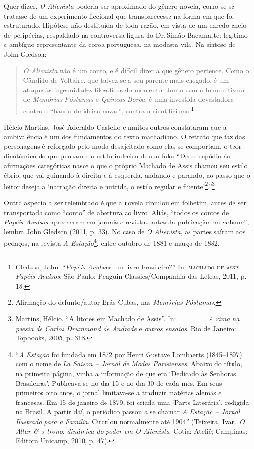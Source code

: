 Quer dizer, \emph{O Alienista} poderia ser aproximado do gênero novela,
como se se tratasse de um experimento ficcional que transparecesse na
forma em que foi estruturado. Hipótese não destituída de toda razão, em
vista de um enredo cheio de peripécias, respaldado na controversa figura
do Dr.\,Simão Bacamarte: legítimo e ambíguo representante da coroa
portuguesa, na modesta vila. Na síntese de John Gledson:

\begin{quote}
\emph{O Alienista} não é um conto, e é difícil dizer a que gênero
pertence. Como o Cândido de Voltaire, que talvez seja seu parente mais
chegado, é um ataque às ingenuidades filosóficas do momento. Junto com o
humanitismo de \emph{Memórias Póstumas} e \emph{Quincas Borba}, é uma
investida devastadora contra o ``bando de ideias novas'', contra o
cientificismo.\footnote{Gledson, John. ``\emph{Papéis Avulsos}: um livro
  brasileiro?'' In: \textsc{machado de assis}. \emph{Papéis Avulsos}. São Paulo:
  Penguin Classics/Companhia das Letras, 2011, p. 18.}
\end{quote}

Hélcio Martins, José Aderaldo Castello e muitos outros constataram que a
ambivalência é um dos fundamentos do texto machadiano. O retrato que faz
das personagens é reforçado pelo modo desajeitado como elas se
comportam, o teor dicotômico do que pensam e o estilo indeciso de sua
fala: ``Desse repúdio às afirmações categóricas nasce o que o próprio
Machado de Assis chamou seu estilo ébrio, que vai guinando à direita e à
esquerda, andando e parando, ao passo que o leitor deseja a `narração
direita e nutrida, o estilo regular e fluente'\footnote{Afirmação do
  defunto/autor Brás Cubas, nas \emph{Memórias Póstumas}.}.''\footnote{Martins,
  Hélcio. ``A litotes em Machado de Assis''. In: \_\_\_\_\_. \emph{A
  rima na poesia de Carlos Drummond de Andrade} e \emph{outros ensaios}.
  Rio de Janeiro: Topbooks, 2005, p. 318.}

Outro aspecto a ser relembrado é que a novela circulou em folhetim,
antes de ser transportada como ``conto'' de abertura ao livro. Aliás,
``todos os contos de \emph{Papéis Avulsos} apareceram em jornais e
revistas antes da publicação em volume'', lembra John Gledson (2011, p.
33). No caso de \emph{O Alienista}, as partes saíram aos pedaços, na
revista \emph{A Estação}\footnote{``\emph{A Estação} foi fundada em 1872
  por Henri Gustave Lombaerts (1845--1897) com o nome de \emph{La Saison
  -- Jornal de Modas Parisienses}. Abaixo do título, na primeira página,
  vinha a informação de que era `Dedicado às Senhoras Brasileiras'.
  Publicava-se no dia 15 e no dia 30 de cada mês. Em seus primeiros oito
  anos, o jornal limitava-se a traduzir matérias alemãs e francesas. Em
  15 de janeiro de 1879, foi criada uma `Parte Literária', redigida no
  Brasil. A partir daí, o periódico passou a se chamar \emph{A Estação
  -- Jornal Ilustrado para a Família}. Circulou normalmente até 1904''
  (Teixeira, Ivan. \emph{O Altar \& o trono: dinâmica do poder em O
  Alienista}. Cotia: Ateliê; Campinas: Editora Unicamp, 2010, p. 47).},
entre outubro de 1881 e março de 1882.

